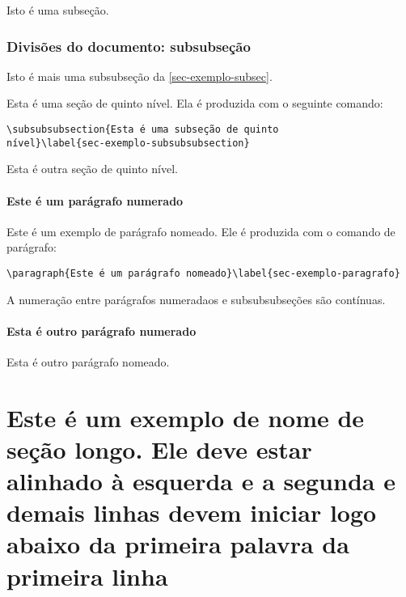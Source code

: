 Isto é uma subseção.

\subsubsection{Divisões do documento: subsubseção}

Isto é mais uma subsubseção da \cref{sec-exemplo-subsec}.

\label{sec-exemplo-subsubsubsection}

Esta é uma seção de quinto nível. Ela é produzida com o seguinte comando:

\begin{verbatim}
\subsubsubsection{Esta é uma subseção de quinto
nível}\label{sec-exemplo-subsubsubsection}
\end{verbatim}

\label{sec-exemplo-subsubsubsection-outro}

Esta é outra seção de quinto nível.

\paragraph{Este é um parágrafo numerado}\label{sec-exemplo-paragrafo}

Este é um exemplo de parágrafo nomeado. Ele é produzida com o comando de parágrafo:

\begin{verbatim}
\paragraph{Este é um parágrafo nomeado}\label{sec-exemplo-paragrafo}
\end{verbatim}

A numeração entre parágrafos numeradaos e subsubsubseções são contínuas.

\paragraph{Esta é outro parágrafo numerado}\label{sec-exemplo-paragrafo-outro}

Esta é outro parágrafo nomeado.

\section{Este é um exemplo de nome de seção longo. Ele deve estar alinhado à esquerda e a segunda e demais linhas devem iniciar logo abaixo da primeira palavra da primeira linha}

